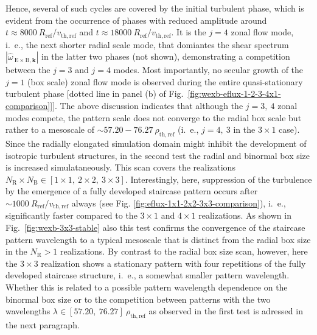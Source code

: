 \documentclass[aip, amsmath, amssymb, reprint, twocolumn]{revtex4-1}
\newcommand{\hatwexbkvec}{\hat{\omega}_{\mathrm{\:E \times B},\mathbf{k}}}
\newcommand{\NR}{N_\mathrm{R}}
\newcommand{\NB}{N_\mathrm{B}}
\newcommand{\vthref}{v_\mathrm{th,ref}}
\newcommand{\Rref}{R_\mathrm{ref}}
\newcommand{\rhothref}{\rho_\mathrm{th,ref}}
\begin{document}
Hence, several of such cycles are covered by the initial turbulent phase, which is evident from the occurrence of phases with reduced amplitude around $t \approx 8000~\Rref/\vthref$ and $t \approx 18000~\Rref/\vthref$.
It is the $j = 4$ zonal flow mode, i.~e., the next shorter radial scale mode, that domiantes the shear spectrum $|\hatwexbkvec|$ in the latter two phases (not shown), demonstrating a competition between the $j = 3$ and $j = 4$ modes.
Most importantly, no secular growth of the $j = 1$ (box scale) zonal flow mode is observed during the entire quasi-stationary turbulent phase [dotted line in panel (b) of Fig.~\ref{fig:wexb-eflux-1-2-3-4x1-comparison}]].
The above discussion indicates that although the $j = 3,~4$ zonal modes compete, the pattern scale does not converge to the radial box scale but rather to a mesoscale of $\sim 57.20 - 76.27~\rhothref$ (i.~e., $j = 4,~3$ in the $3\times1$ case). \\

Since the radially elongated simulation domain might inhibit the development of isotropic turbulent structures, in the second test the radial and binormal box size is increased simulataneously.
This scan covers the realizations $\NR\times\NB \in [1\times1,~2\times2,~3\times3]$.
Interestingly, here, suppression of the turbulence by the emergence of a fully developed staircase pattern occurs after $\sim 1000~\Rref/\vthref$ always (see Fig. \ref{fig:eflux-1x1-2x2-3x3-comparison}), i.~e., significantly faster compared to the $3\times1$ and $4\times1$ realizations. 
%
As shown in Fig.~\ref{fig:wexb-3x3-stable} also this test confirms the convergence of the staircase pattern wavelength to a typical mesoscale that is distinct from the radial box size in the $\NR > 1$ realizations. 
By contrast to the radial box size scan, however, here the $3\times3$ realization shows a stationary pattern with four repetitions of the fully developed staircase structure, i.~e., a somewhat smaller pattern wavelength. 
Whether this is related to a possible pattern wavelength dependence on the binormal box size or to the competition between patterns with the two wavelengths $\lambda \in [57.20,~ 76.27]~\rhothref$ as observed in the first test is adressed in the next paragraph. \bigskip
\end{document}
